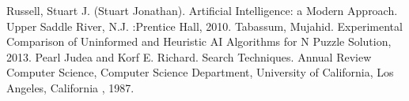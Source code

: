 \documentclass{svproc}
\begin{document}
\begin{thebibliography}{6}
%

Russell, Stuart J. (Stuart Jonathan). Artificial Intelligence: a Modern Approach. Upper Saddle River, N.J.       :Prentice Hall, 2010.
\bibitem{}
Tabassum, Mujahid. Experimental Comparison of Uninformed and Heuristic AI Algorithms for N Puzzle Solution, 2013. 
\bibitem{}
Pearl Judea and Korf E. Richard. Search Techniques. Annual Review Computer Science, Computer Science Department, University of California, Los Angeles, California , 1987. 

\end{thebibliography}
\end{document}
